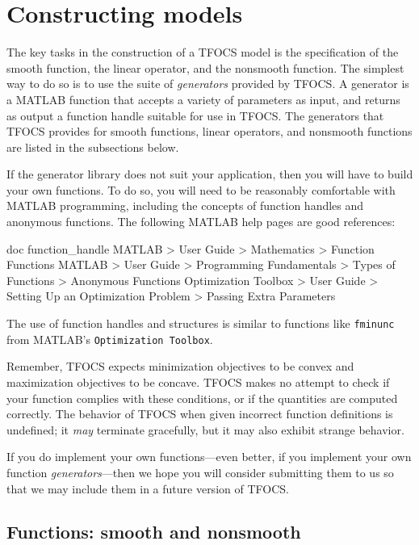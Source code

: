 \documentclass{article}
\newcommand{\<}{\langle}
\renewcommand{\>}{\rangle}
\begin{document}
\section{Constructing models}
\label{sec:functions}

The key tasks in the construction of a TFOCS model is the
specification of the smooth function, the linear operator, and
the nonsmooth function. The simplest way to do so is to use
the suite of \emph{generators} provided by TFOCS. A 
generator is a MATLAB function that accepts a variety of parameters
as input, and returns as output a function handle suitable for use in TFOCS. 
The generators that TFOCS provides for smooth functions, linear operators,
and nonsmooth functions are listed in the subsections below.

If the generator library does not suit your application, then you
will have to build your own functions. To do so, you 
will need to be reasonably comfortable with MATLAB programming, 
including the concepts of function handles and anonymous functions.
The following MATLAB help pages are good references:
\begin{code}
	doc function_handle
	MATLAB > User Guide > Mathematics > Function Functions
	MATLAB > User Guide > Programming Fundamentals > Types of Functions 
	       > Anonymous Functions
	Optimization Toolbox > User Guide > Setting Up an Optimization Problem 
	       > Passing Extra Parameters
\end{code}
The use of function handles
and structures is similar to functions like {\tt fminunc}
from MATLAB's {\tt Optimization Toolbox}.

Remember, TFOCS expects minimization objectives to be convex
and maximization objectives to be concave. 
TFOCS makes no attempt to check if your function complies with
these conditions, or if the quantities are computed correctly.
The behavior of TFOCS when given incorrect function definitions
is undefined; it  \emph{may} terminate gracefully, but it 
may also exhibit strange behavior.

If you do implement your own functions---even better,
if you implement your own function \emph{generators}---then we hope
you will consider submitting them to us so that we may include
them in a future version of TFOCS.

\subsection{Functions: smooth and nonsmooth}
\label{sec:smoothandnon}
\end{document}
